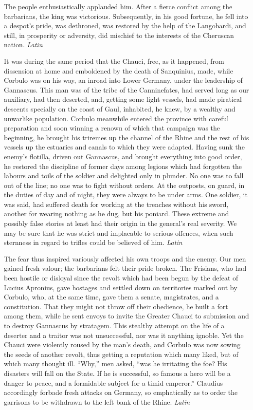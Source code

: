 The people enthusiastically applauded him. After a fierce conflict among the barbarians, the king was victorious. Subsequently, in his good fortune, he fell into a despot's pride, was dethroned, was restored by the help of the Langobardi, and still, in prosperity or adversity, did mischief to the interests of the Cheruscan nation. \emph{Latin}


It was during the same period that the Chauci, free, as it happened, from dissension at home and emboldened by the death of Sanquinius, made, while Corbulo was on his way, an inroad into Lower Germany, under the leadership of Gannascus. This man was of the tribe of the Canninefates, had served long as our auxiliary, had then deserted, and, getting some light vessels, had made piratical descents specially on the coast of Gaul, inhabited, he knew, by a wealthy and unwarlike population. Corbulo meanwhile entered the province with careful preparation and soon winning a renown of which that campaign was the beginning, he brought his triremes up the channel of the Rhine and the rest of his vessels up the estuaries and canals to which they were adapted. Having sunk the enemy's flotilla, driven out Gannascus, and brought everything into good order, he restored the discipline of former days among legions which had forgotten the labours and toils of the soldier and delighted only in plunder. No one was to fall out of the line; no one was to fight without orders. At the outposts, on guard, in the duties of day and of night, they were always to be under arms. One soldier, it was said, had suffered death for working at the trenches without his sword, another for wearing nothing as he dug, but his poniard. These extreme and possibly false stories at least had their origin in the general's real severity. We may be sure that he was strict and implacable to serious offences, when such sternness in regard to trifles could be believed of him. \emph{Latin}


The fear thus inspired variously affected his own troops and the enemy. Our men gained fresh valour; the barbarians felt their pride broken. The Frisians, who had been hostile or disloyal since the revolt which had been begun by the defeat of Lucius Apronius, gave hostages and settled down on territories marked out by Corbulo, who, at the same time, gave them a senate, magistrates, and a constitution. That they might not throw off their obedience, he built a fort among them, while he sent envoys to invite the Greater Chauci to submission and to destroy Gannascus by stratagem. This stealthy attempt on the life of a deserter and a traitor was not unsuccessful, nor was it anything ignoble. Yet the Chauci were violently roused by the man's death, and Corbulo was now sowing the seeds of another revolt, thus getting a reputation which many liked, but of which many thought ill. ``Why,'' men asked, ``was he irritating the foe? His disasters will fall on the State. If he is successful, so famous a hero will be a danger to peace, and a formidable subject for a timid emperor.'' Claudius accordingly forbade fresh attacks on Germany, so emphatically as to order the garrisons to be withdrawn to the left bank of the Rhine. \emph{Latin}

